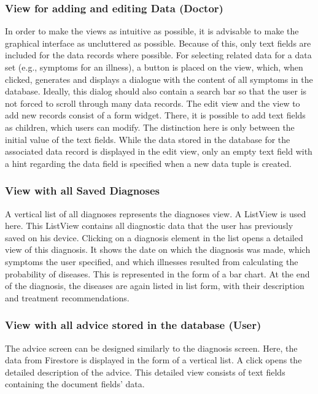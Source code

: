 \subsubsection{\textbf{View for adding and editing Data (Doctor)}}
In order to make the views as intuitive as possible, it is advisable to make the graphical interface as uncluttered as possible. Because of this, only text fields are included for the data records where possible. For selecting related data for a data set (e.g., symptoms for an illness), a button is placed on the view, which, when clicked, generates and displays a dialogue with the content of all symptoms in the database. Ideally, this dialog should also contain a search bar so that the user is not forced to scroll through many data records. The edit view and the view to add new records consist of a form widget. There, it is possible to add text fields as children, which users can modify. The distinction here is only between the initial value of the text fields. While the data stored in the database for the associated data record is displayed in the edit view, only an empty text field with a hint regarding the data field is specified when a new data tuple is created.

\subsubsection{\textbf{View with all Saved Diagnoses}}
A vertical list of all diagnoses represents the diagnoses view. A ListView is used here. This ListView contains all diagnostic data that the user has previously saved on his device. Clicking on a diagnosis element in the list opens a detailed view of this diagnosis. It shows the date on which the diagnosis was made, which symptoms the user specified, and which illnesses resulted from calculating the probability of diseases. This is represented in the form of a bar chart. At the end of the diagnosis, the diseases are again listed in list form, with their description and treatment recommendations.

\subsubsection{\textbf{View with all advice stored in the database (User) }}
The advice screen can be designed similarly to the diagnosis screen. Here, the data from Firestore is displayed in the form of a vertical list. A click opens the detailed description of the advice. This detailed view consists of text fields containing the document fields' data.

